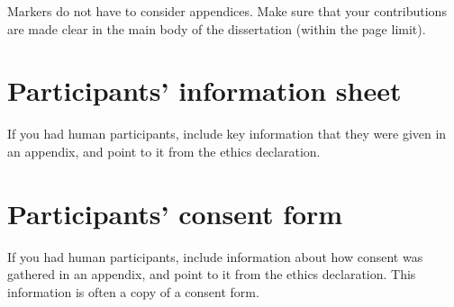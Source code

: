 \documentclass[logo,bsc,singlespacing,parskip,online]{infthesis}
\begin{document}
Markers do not have to consider appendices. Make sure that your contributions
are made clear in the main body of the dissertation (within the page limit).

\chapter{Participants' information sheet}

If you had human participants, include key information that they were given in
an appendix, and point to it from the ethics declaration.

\chapter{Participants' consent form}

If you had human participants, include information about how consent was
gathered in an appendix, and point to it from the ethics declaration.
This information is often a copy of a consent form.
\end{document}
